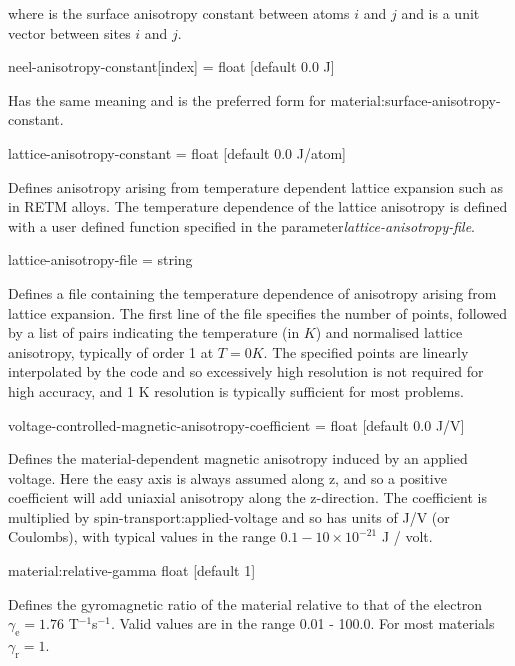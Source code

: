 \noindent where \ksurf is the surface anisotropy constant between atoms $i$ and $j$ and \rij is a unit vector between sites $i$ and $j$.

{\zicf neel-anisotropy-constant[index] = float [default 0.0 J]}
Has the same meaning and is the preferred form for material:surface-anisotropy-constant.

{\zicf lattice-anisotropy-constant = float [default 0.0 J/atom]}
Defines anisotropy arising from temperature dependent lattice expansion such as in RETM alloys. The temperature dependence of the lattice anisotropy is defined with a user defined function specified in the parameter\textit{lattice-anisotropy-file}.

{\zicf lattice-anisotropy-file = string} Defines a file containing the temperature dependence of anisotropy arising from lattice expansion. The first line of the file specifies the number of points, followed by a list of pairs indicating the temperature (in $K$) and normalised lattice anisotropy, typically of order 1 at $T = 0 K$. The specified points are
linearly interpolated by the code and so excessively high resolution is not required for high accuracy, and 1 K resolution is typically sufficient for most problems.

{\zicf voltage-controlled-magnetic-anisotropy-coefficient = float [default 0.0 J/V]}
Defines the material-dependent magnetic anisotropy induced by an applied voltage.
Here the easy axis is always assumed along z, and so a positive coefficient will
add uniaxial anisotropy along the z-direction. The coefficient is multiplied by
spin-transport:applied-voltage and so has units of J/V (or Coulombs), with typical
values in the range $0.1-10 \times 10^{-21}$ J / volt.


{\zicf material:relative-gamma float [default 1]} Defines the gyromagnetic ratio of the material relative to that of the electron $\gamma_{\mathrm{e}} = 1.76$ T$^{-1}$s$^{-1}$. Valid values are in the range 0.01 - 100.0. For most materials $\gamma_{\mathrm{r}} = 1$.


